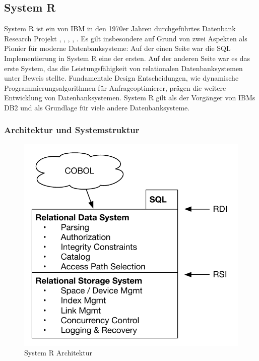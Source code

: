 \subsection{System R}

System R ist ein von IBM in den 1970er Jahren durchgeführtes Datenbank Research Projekt \cite{selinger1979access}, \cite{wade2012ibm}, \cite{chamberlin1981history}, \cite{astrahan1976system}, \cite{astrahan1978system}. Es gilt insbesondere auf Grund von zwei Aspekten als Pionier für moderne Datenbanksysteme: Auf der einen Seite war die \ac{SQL} Implementierung in System R eine der ersten. Auf der anderen Seite war es das erste System, das die Leistungsfähigkeit von relationalen Datenbanksystemen unter Beweis stellte. Fundamentale Design Entscheidungen, wie dynamische Programmierungsalgorithmen für Anfrageoptimierer, prägen die weitere Entwicklung von Datenbanksystemen. System R gilt als der Vorgänger von IBMs DB2 und als Grundlage für viele andere Datenbanksysteme.


\subsubsection{Architektur und Systemstruktur}

\begin{figure}[ht]
  \centering
  \includegraphics{02_Related_Work/SystemR.pdf}
  \caption{System R Architektur \cite{astrahan1976system} \cite{astrahan1978system}}
  \label{SystemRArchitecture}
\end{figure}



